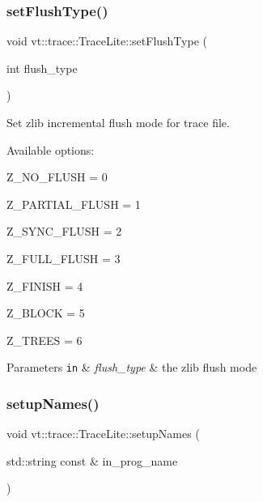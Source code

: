 \subsubsection{\texorpdfstring{set\+Flush\+Type()}{setFlushType()}}
{\footnotesize\ttfamily void vt\+::trace\+::\+Trace\+Lite\+::set\+Flush\+Type (\begin{DoxyParamCaption}\item[{int}]{flush\+\_\+type }\end{DoxyParamCaption})}



Set zlib incremental flush mode for trace file. 

Available options\+:
\begin{DoxyItemize}
\item Z\+\_\+\+N\+O\+\_\+\+F\+L\+U\+SH = 0
\item Z\+\_\+\+P\+A\+R\+T\+I\+A\+L\+\_\+\+F\+L\+U\+SH = 1
\item Z\+\_\+\+S\+Y\+N\+C\+\_\+\+F\+L\+U\+SH = 2
\item Z\+\_\+\+F\+U\+L\+L\+\_\+\+F\+L\+U\+SH = 3
\item Z\+\_\+\+F\+I\+N\+I\+SH = 4
\item Z\+\_\+\+B\+L\+O\+CK = 5
\item Z\+\_\+\+T\+R\+E\+ES = 6
\end{DoxyItemize}


\begin{DoxyParams}[1]{Parameters}
\mbox{\tt in}  & {\em flush\+\_\+type} & the zlib flush mode \\
\hline
\end{DoxyParams}
\mbox{\label{structvt_1_1trace_1_1_trace_lite_a1f8e52289799bcd6b469b20be7d1e149}} 
\subsubsection{\texorpdfstring{setup\+Names()}{setupNames()}}
{\footnotesize\ttfamily void vt\+::trace\+::\+Trace\+Lite\+::setup\+Names (\begin{DoxyParamCaption}\item[{std\+::string const \&}]{in\+\_\+prog\+\_\+name }\end{DoxyParamCaption})}



